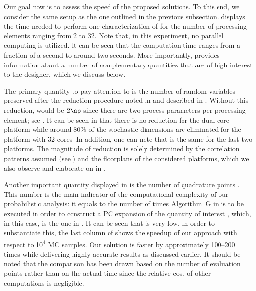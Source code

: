 
Our goal now is to assess the speed of the proposed solutions. To this end, we
consider the same setup as the one outlined in the previous subsection.
 displays the time needed to perform one
characterization of \vg for the number of processing elements \np ranging from 2
to 32. Note that, in this experiment, no parallel computing is utilized. It can
be seen that the computation time ranges from a fraction of a second to around
two seconds. More importantly,  provides
information about a number of complementary quantities that are of high interest
to the designer, which we discuss below.

The primary quantity to pay attention to is the number of random variables \nz
preserved after the reduction procedure noted in  and
described in . Without this reduction, \nz
would be $2 \np$ since there are two process parameters per processing element;
see . It can be seen in
 that there is no reduction for the dual-core
platform while around 80\% of the stochastic dimensions are eliminated for the
platform with 32 cores. In addition, one can note that \nz is the same for the
last two platforms. The magnitude of reduction is solely determined by the
correlation patterns assumed (see ) and the
floorplans of the considered platforms, which we also observe and elaborate on
in .

Another important quantity displayed in  is the
number of quadrature points \nq. This number is the main indicator of the
computational complexity of our probabilistic analysis: it equals to the number
of times Algorithm~G in  is to be executed in order to
construct a \ac{PC} expansion of the quantity of interest \g, which, in this
case, is the one in . It can be seen that \nq
is very low. In order to substantiate this, the last column of
 shows the speedup of our approach with respect
to 10\textsuperscript{4} \ac{MC} samples. Our solution is faster by
approximately 100--200 times while delivering highly accurate results as
discussed earlier. It should be noted that the comparison has been drawn based
on the number of evaluation points rather than on the actual time since the
relative cost of other computations is negligible.

